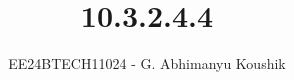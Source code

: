 \documentclass[journal]{IEEEtran}
\begin{document}

\vspace{3cm}

\title{10.3.2.4.4}
\author{EE24BTECH11024 - G. Abhimanyu Koushik}
 \maketitle
{\let\newpage\relax\maketitle}

\renewcommand{\thefigure}{\theenumi}
\renewcommand{\thetable}{\theenumi}
\setlength{\intextsep}{10pt} %


\renewcommand{\thetable}{\theenumi}
\end{document}
